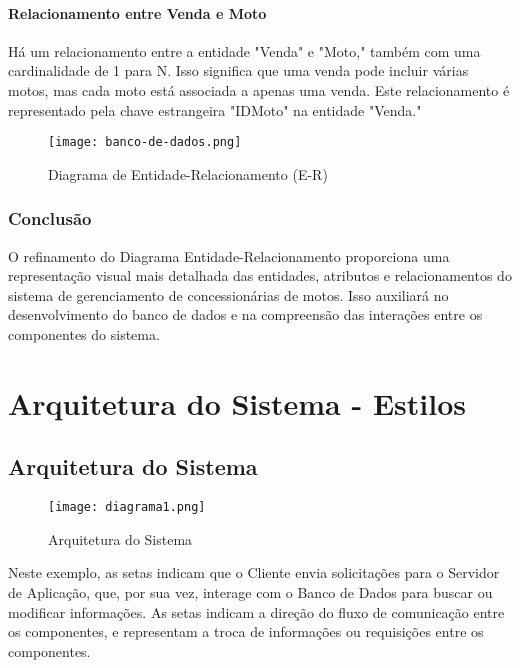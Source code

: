 \paragraph{Relacionamento entre Venda e Moto}

Há um relacionamento entre a entidade "Venda" e "Moto," também com uma cardinalidade de 1 para N. Isso significa que uma venda pode incluir várias motos, mas cada moto está associada a apenas uma venda. Este relacionamento é representado pela chave estrangeira "IDMoto" na entidade "Venda."

\begin{figure}[h]
	\centering
	\texttt{[image: banco-de-dados.png]}
	\caption{Diagrama de Entidade-Relacionamento (E-R)}
	\label{fig:Diagrama de Banco de Dados}
\end{figure}

\subsubsection{Conclusão}

O refinamento do Diagrama Entidade-Relacionamento proporciona uma representação visual mais detalhada das entidades, atributos e relacionamentos do sistema de gerenciamento de concessionárias de motos. Isso auxiliará no desenvolvimento do banco de dados e na compreensão das interações entre os componentes do sistema.


\section{Arquitetura do Sistema - Estilos}


    \subsection{Arquitetura do Sistema}

\begin{figure}[h]
	\centering
	\texttt{[image: diagrama1.png]}
	\caption{Arquitetura do Sistema}
	\label{fig:diagrama1}
\end{figure}

Neste exemplo, as setas indicam que o Cliente envia solicitações para o Servidor de Aplicação, que, por sua vez, interage com o Banco de Dados para buscar ou modificar informações. As setas indicam a direção do fluxo de comunicação entre os componentes, e representam a troca de informações ou requisições entre os componentes.

